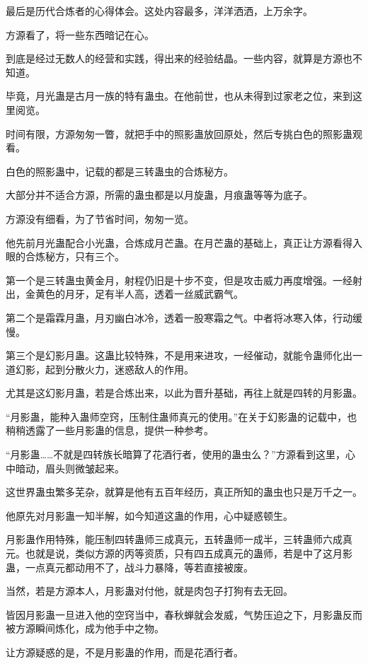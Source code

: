 \begin{this_body}
最后是历代合炼者的心得体会。这处内容最多，洋洋洒洒，上万余字。

方源看了，将一些东西暗记在心。

到底是经过无数人的经营和实践，得出来的经验结晶。一些内容，就算是方源也不知道。

毕竟，月光蛊是古月一族的特有蛊虫。在他前世，也从未得到过家老之位，来到这里阅览。

时间有限，方源匆匆一瞥，就把手中的照影蛊放回原处，然后专挑白色的照影蛊观看。

白色的照影蛊中，记载的都是三转蛊虫的合炼秘方。

大部分并不适合方源，所需的蛊虫都是以月旋蛊，月痕蛊等等为底子。

方源没有细看，为了节省时间，匆匆一览。

他先前月光蛊配合小光蛊，合炼成月芒蛊。在月芒蛊的基础上，真正让方源看得入眼的合炼秘方，只有三个。

第一个是三转蛊虫黄金月，射程仍旧是十步不变，但是攻击威力再度增强。一经射出，金黄色的月牙，足有半人高，透着一丝威武霸气。

第二个是霜霖月蛊，月刃幽白冰冷，透着一股寒霜之气。中者将冰寒入体，行动缓慢。

第三个是幻影月蛊。这蛊比较特殊，不是用来进攻，一经催动，就能令蛊师化出一道幻影，起到分散火力，迷惑敌人的作用。

尤其是这幻影月蛊，若是合炼出来，以此为晋升基础，再往上就是四转的月影蛊。

“月影蛊，能种入蛊师空窍，压制住蛊师真元的使用。”在关于幻影蛊的记载中，也稍稍透露了一些月影蛊的信息，提供一种参考。

“月影蛊……不就是四转族长暗算了花酒行者，使用的蛊虫么？”方源看到这里，心中暗动，眉头则微皱起来。

这世界蛊虫繁多芜杂，就算是他有五百年经历，真正所知的蛊虫也只是万千之一。

他原先对月影蛊一知半解，如今知道这蛊的作用，心中疑惑顿生。

月影蛊作用特殊，能压制四转蛊师三成真元，五转蛊师一成半，三转蛊师六成真元。也就是说，类似方源的丙等资质，只有四五成真元的蛊师，若是中了这月影蛊，一点真元都动用不了，战斗力暴降，等若直接被废。

当然，若是方源本人，月影蛊对付他，就是肉包子打狗有去无回。

皆因月影蛊一旦进入他的空窍当中，春秋蝉就会发威，气势压迫之下，月影蛊反而被方源瞬间炼化，成为他手中之物。

让方源疑惑的是，不是月影蛊的作用，而是花酒行者。


\end{this_body}
